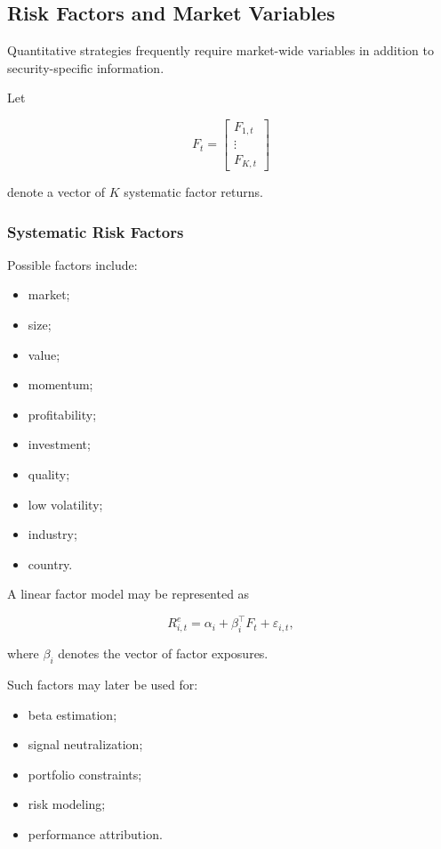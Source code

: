 \documentclass[11pt,a4paper]{article}
\begin{document}
\subsection{Risk Factors and Market Variables}
\label{subsec:risk_factors_market_variables}

Quantitative strategies frequently require market-wide variables in addition to
security-specific information.

Let

\begin{equation}
F_t
=
\begin{bmatrix}
F_{1,t}\\
\vdots\\
F_{K,t}
\end{bmatrix}
\end{equation}

denote a vector of $K$ systematic factor returns.


\subsubsection{Systematic Risk Factors}

Possible factors include:

\begin{itemize}
    \item market;
    \item size;
    \item value;
    \item momentum;
    \item profitability;
    \item investment;
    \item quality;
    \item low volatility;
    \item industry;
    \item country.
\end{itemize}

A linear factor model may be represented as

\begin{equation}
R_{i,t}^{e}
=
\alpha_i
+
\beta_i^\top F_t
+
\varepsilon_{i,t},
\end{equation}

where $\beta_i$ denotes the vector of factor exposures.

Such factors may later be used for:

\begin{itemize}
    \item beta estimation;
    \item signal neutralization;
    \item portfolio constraints;
    \item risk modeling;
    \item performance attribution.
\end{itemize}
\end{document}

